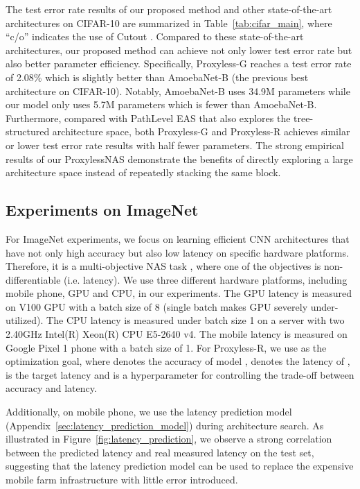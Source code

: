 \documentclass{article} \usepackage{iclr2019_conference,times}
\begin{document}
The test error rate results of our proposed method and other state-of-the-art architectures on CIFAR-10 are summarized in Table~\ref{tab:cifar_main}, where ``c/o'' indicates the use of Cutout \citep{devries2017improved}. Compared to these state-of-the-art architectures, our proposed method can achieve not only lower test error rate but also better parameter efficiency. Specifically, Proxyless-G reaches a test error rate of 2.08\% which is slightly better than AmoebaNet-B \citep{real2018regularized} (the previous best architecture on CIFAR-10). Notably, AmoebaNet-B uses 34.9M parameters while our model only uses 5.7M parameters which is  fewer than AmoebaNet-B. 
Furthermore, compared with PathLevel EAS \citep{cai2018path} that also explores the tree-structured architecture space, both Proxyless-G and Proxyless-R achieves similar or lower test error rate results with half fewer parameters. 
The strong empirical results of our ProxylessNAS demonstrate the benefits of directly exploring a large architecture space instead of repeatedly stacking the same block. 

\subsection{Experiments on ImageNet}
For ImageNet experiments, we focus on learning efficient CNN architectures \citep{iandola2016squeezenet,howard2017mobilenets,sandler2018mobilenetv2,zhu2018sparsenet} that have not only high accuracy but also low latency on specific hardware platforms. Therefore, it is a multi-objective NAS task \citep{hsu2018monas,dong2018dpp,elsken2018multi,he2018amc,wang2019haq,tan2018mnasnet}, where one of the objectives is non-differentiable (i.e. latency). We use three different hardware platforms, including mobile phone, GPU and CPU, in our experiments. The GPU latency is measured on V100 GPU with a batch size of 8 (single batch makes GPU severely under-utilized). The CPU latency is measured under batch size 1 on a server with two 2.40GHz Intel(R) Xeon(R) CPU E5-2640 v4. The mobile latency is measured on Google Pixel 1 phone with a batch size of 1. For Proxyless-R, we use  as the optimization goal, where  denotes the accuracy of model ,  denotes the latency of ,  is the target latency and  is a hyperparameter for controlling the trade-off between accuracy and latency. 

Additionally, on mobile phone, we use the latency prediction model (Appendix~\ref{sec:latency_prediction_model}) during architecture search. As illustrated in Figure~\ref{fig:latency_prediction}, we observe a strong correlation between the predicted latency and real measured latency on the test set, suggesting that the latency prediction model can be used to replace the expensive mobile farm infrastructure \citep{tan2018mnasnet} with little error introduced. 
\end{document}
